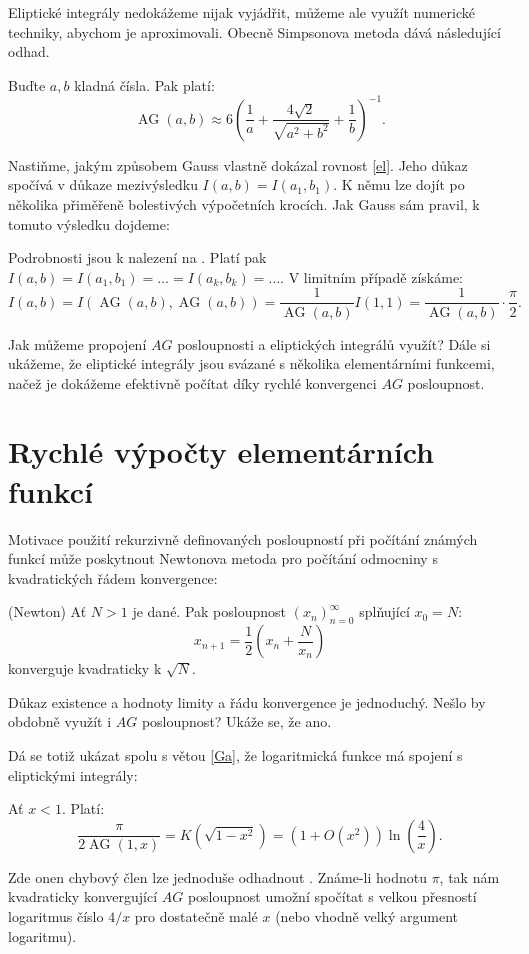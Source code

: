 \documentclass[12pt]{report}
\DeclareMathOperator{\AG}{AG}
\begin{document}
Eliptické integrály nedokážeme nijak  vyjádřit, můžeme ale využít numerické techniky, abychom je aproximovali. Obecně Simpsonova metoda dává následující odhad.
\begin{veta}
Buďte $a,b$ kladná čísla. Pak platí:
$$\AG(a,b) \approx 6 \left(\frac{1}{a} + \frac{4\sqrt{2}}{\sqrt{a^2+b^2}} + \frac{1}{b} \right)^{-1}.$$
\end{veta}


Nastiňme, jakým způsobem Gauss vlastně dokázal rovnost \eqref{el}. Jeho důkaz spočívá v důkaze mezivýsledku $I(a,b) = I(a_1,b_1)$. K němu lze dojít po několika přiměřeně bolestivých výpočetních krocích. Jak Gauss sám pravil, k tomuto výsledku dojdeme:

\begin{center}
\begin{verse}
\textit{}
\end{verse}
\end{center}
Podrobnosti jsou k nalezení na \cite[Ch. 2 Sec. 3]{Pi}. Platí pak $I(a,b) = I(a_1,b_1) = \dots = I(a_k,b_k) = \dots$. V limitním případě získáme: $$I(a,b) = I(\AG(a,b),\AG(a,b)) = \frac{1}{\AG(a,b)} I(1,1) = \frac{1}{\AG(a,b)} \cdot \frac{\pi}{2}.$$ 

Jak můžeme propojení $AG$ posloupnosti a eliptických integrálů využít? Dále si ukážeme, že eliptické integrály jsou svázané s několika elementárními funkcemi, načež je dokážeme efektivně počítat díky rychlé konvergenci $AG$ posloupnost.

\section{Rychlé výpočty elementárních funkcí}

Motivace použití rekurzivně definovaných posloupností při počítání známých funkcí může poskytnout Newtonova metoda pro počítání odmocniny s kvadratických řádem konvergence:

\begin{veta}(Newton)
Ať $N>1$ je dané. Pak posloupnost $(x_n)_{n=0}^{\infty}$ splňující $x_0 = N$:
$$x_{n+1} = \frac{1}{2} \left( x_n + \frac{N}{x_n}\right)$$
konverguje kvadraticky k $\sqrt{N}$.
\end{veta}
Důkaz existence a hodnoty limity a řádu konvergence je jednoduchý. Nešlo by obdobně využít i $AG$ posloupnost? Ukáže se, že ano.

Dá se totiž ukázat spolu s větou \ref{Ga}, že logaritmická funkce má spojení s eliptickými integrály:
\begin{veta}
Ať $x < 1$. Platí:
$$ \frac{\pi}{2 \AG(1,x)} =K(\sqrt{1-x^2}) = \left(1+O(x^2)\right)\ln\left(\frac{4}{x} \right).$$
\end{veta}
Zde onen chybový člen lze jednoduše odhadnout \cite[Ch 1, Sec 3, Exc. 4]{Pi}. Známe-li hodnotu $\pi$, tak nám kvadraticky konvergující $AG$ posloupnost umožní spočítat s velkou přesností logaritmus číslo $4/x$ pro dostatečně malé $x$ (nebo vhodně velký argument logaritmu).
\end{document}
